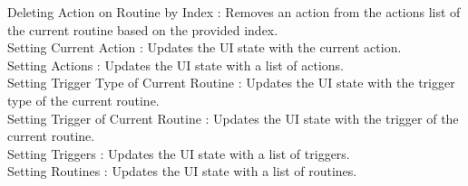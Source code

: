 \begin{enumerate}[label=\arabic*]
\begin{enumerate}[label=\alph*]
\begin{enumerate}
                Deleting Action on Routine by Index : Removes an action from the actions list of the current routine based on the provided index.\\

                Setting Current Action : Updates the UI state with the current action.\\

                Setting Actions : Updates the UI state with a list of actions.\\

                Setting Trigger Type of Current Routine : Updates the UI state with the trigger type of the current routine.\\

                Setting Trigger of Current Routine : Updates the UI state with the trigger of the current routine.\\

                Setting Triggers : Updates the UI state with a list of triggers.\\

                Setting Routines : Updates the UI state with a list of routines.\\


\end{enumerate}
\end{enumerate}
\end{enumerate}
